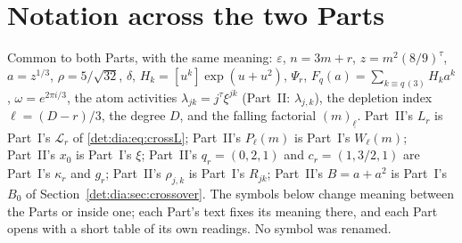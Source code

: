 \documentclass[11pt,letterpaper]{article}
\numberwithin{equation}{section}
\theoremstyle{definition}\newtheorem{definition}[theorem]{Definition}
\theoremstyle{remark}\newtheorem{remark}[theorem]{Remark}
\newcommand{\fall}[2]{(#1)_{\underline{#2}}}
\newcommand{\eps}{\varepsilon}
\begin{document}
\section*{Notation across the two Parts}\label{det:sec:notation}
Common to both Parts, with the same meaning: $\eps$, $n=3m+r$, $z=m^2(8/9)^\tau$, $a=z^{1/3}$, $\rho=5/\sqrt{32}$, $\delta$, $H_k=[u^k]\exp(u+u^2)$, $\Psi_r$, $F_q(a)=\sum_{k\equiv q\,(3)}H_ka^k$, $\omega=e^{2\pi i/3}$, the atom activities $\lambda_{jk}=j^\tau\xi^{jk}$ (Part~II: $\lambda_{j,k}$), the depletion index $\ell=(D-r)/3$, the degree $D$, and the falling factorial $\fall m\ell$. Part~II's $L_r$ is Part~I's $\mathcal L_r$ of \eqref{det:dia:eq:crossL}; Part~II's $P_\ell(m)$ is Part~I's $W_\ell(m)$; Part~II's $x_0$ is Part~I's $\xi$; Part~II's $q_r=(0,2,1)$ and $c_r=(1,3/2,1)$ are Part~I's $\kappa_r$ and $g_r$; Part~II's $\rho_{j,k}$ is Part~I's $R_{jk}$; Part~II's $B=a+a^2$ is Part~I's $B_0$ of Section~\ref{det:dia:sec:crossover}. The symbols below change meaning between the Parts or inside one; each Part's text fixes its meaning there, and each Part opens with a short table of its own readings. No symbol was renamed.
\begingroup\small
\renewcommand{\theHtable}{notation.\arabic{table}}
\end{document}

